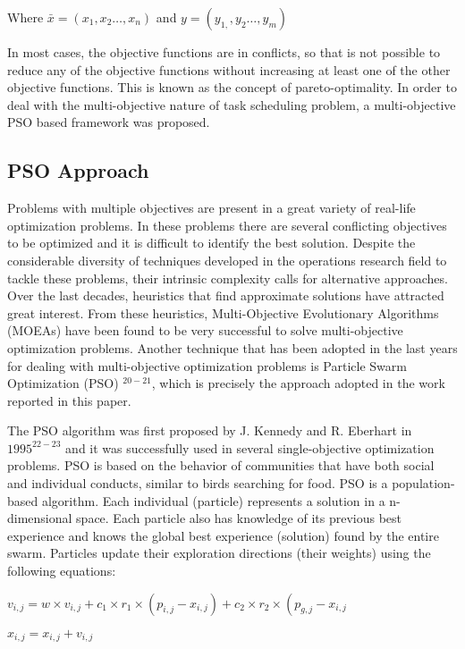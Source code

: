 \documentclass[10pt]{article}
\begin{document}
Where $\bar{x}=\left(x_{1}, x_{2} \ldots, x_{n}\right)$ and $y=\left(y_{1,}, y_{2} \ldots, y_{m}\right)$

In most cases, the objective functions are in conflicts, so that is not possible to reduce any of the objective functions without increasing at least one of the other objective functions. This is known as the concept of pareto-optimality. In order to deal with the multi-objective nature of task scheduling problem, a multi-objective PSO based framework was proposed.

\subsection{PSO Approach}
Problems with multiple objectives are present in a great variety of real-life optimization problems. In these problems there are several conflicting objectives to be optimized and it is difficult to identify the best solution. Despite the considerable diversity of techniques developed in the operations research field to tackle these problems, their intrinsic complexity calls for alternative approaches. Over the last decades, heuristics that find approximate solutions have attracted great interest. From these heuristics, Multi-Objective Evolutionary Algorithms (MOEAs) have been found to be very successful to solve multi-objective optimization problems. Another technique that has been adopted in the last years for dealing with multi-objective optimization problems is Particle Swarm Optimization (PSO) ${ }^{20-21}$, which is precisely the approach adopted in the work reported in this paper.

The PSO algorithm was first proposed by J. Kennedy and R. Eberhart in $1995^{22-23}$ and it was successfully used in several single-objective optimization problems. PSO is based on the behavior of communities that have both social and individual conducts, similar to birds searching for food. PSO is a population-based algorithm. Each individual (particle) represents a solution in a n-dimensional space. Each particle also has knowledge of its previous best experience and knows the global best experience (solution) found by the entire swarm. Particles update their exploration directions (their weights) using the following equations:

$v_{i, j}=w \times v_{i, j}+c_{1} \times r_{1} \times\left(p_{i, j}-x_{i, j}\right)+c_{2} \times r_{2} \times\left(p_{g, j}-x_{i, j}\right.$

$x_{i, j}=x_{i, j}+v_{i, j}$
\end{document}
